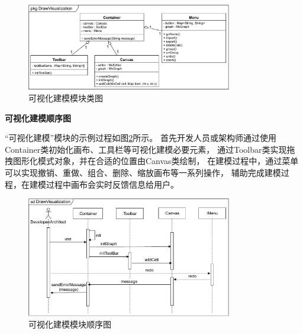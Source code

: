 \begin{figure}[!htbp] %
    \centering %
    \includegraphics[width=0.8\textwidth]{FIGs/chapter4/classDrawVisualization.pdf} %
    \caption{可视化建模模块类图} %
    \label{classDrawVisualization} %
\end{figure}%

\textbf{可视化建模顺序图}

“可视化建模”模块的示例过程如图\ref{sdDrawVisualization}所示。
首先开发人员或架构师通过使用Container类初始化画布、工具栏等可视化建模必要元素，
通过Toolbar类实现拖拽图形化模式对象，并在合适的位置由Canvas类绘制，
在建模过程中，通过菜单可以实现撤销、重做、组合、删除、缩放画布等一系列操作，
辅助完成建模过程，在建模过程中画布会实时反馈信息给用户。

\begin{figure}[!htbp] %
    \centering %
    \includegraphics[width=0.8\textwidth]{FIGs/chapter4/sdDrawVisualization.pdf} %
    \caption{可视化建模模块顺序图} %
    \label{sdDrawVisualization} %
\end{figure}%

